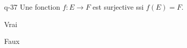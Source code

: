 \begin{truefalse}{q-37}
Une fonction $f : E\to F$ est surjective ssi $f(E)=F$.
\item* Vrai
\item Faux
\end{truefalse}

